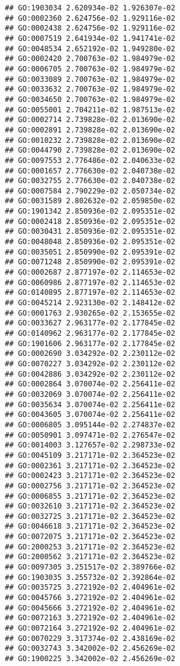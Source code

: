 \documentclass[
]{article}
\begin{document}
\begin{verbatim}
## GO:1903034 2.620934e-02 1.926307e-02
## GO:0002360 2.624756e-02 1.929116e-02
## GO:0002438 2.624756e-02 1.929116e-02
## GO:0007519 2.641934e-02 1.941741e-02
## GO:0048534 2.652192e-02 1.949280e-02
## GO:0002420 2.700763e-02 1.984979e-02
## GO:0006705 2.700763e-02 1.984979e-02
## GO:0033089 2.700763e-02 1.984979e-02
## GO:0033632 2.700763e-02 1.984979e-02
## GO:0034650 2.700763e-02 1.984979e-02
## GO:0055001 2.704211e-02 1.987513e-02
## GO:0002714 2.739828e-02 2.013690e-02
## GO:0002891 2.739828e-02 2.013690e-02
## GO:0010232 2.739828e-02 2.013690e-02
## GO:0044790 2.739828e-02 2.013690e-02
## GO:0097553 2.776486e-02 2.040633e-02
## GO:0001657 2.776630e-02 2.040738e-02
## GO:0032755 2.776630e-02 2.040738e-02
## GO:0007584 2.790229e-02 2.050734e-02
## GO:0031589 2.802632e-02 2.059850e-02
## GO:1901342 2.850936e-02 2.095351e-02
## GO:0002418 2.850936e-02 2.095351e-02
## GO:0030431 2.850936e-02 2.095351e-02
## GO:0048048 2.850936e-02 2.095351e-02
## GO:0035051 2.850990e-02 2.095391e-02
## GO:0071248 2.850990e-02 2.095391e-02
## GO:0002687 2.877197e-02 2.114653e-02
## GO:0060986 2.877197e-02 2.114653e-02
## GO:0140895 2.877197e-02 2.114653e-02
## GO:0045214 2.923130e-02 2.148412e-02
## GO:0001763 2.930265e-02 2.153655e-02
## GO:0033627 2.963177e-02 2.177845e-02
## GO:0140962 2.963177e-02 2.177845e-02
## GO:1901606 2.963177e-02 2.177845e-02
## GO:0002690 3.034292e-02 2.230112e-02
## GO:0070227 3.034292e-02 2.230112e-02
## GO:0042886 3.034292e-02 2.230112e-02
## GO:0002864 3.070074e-02 2.256411e-02
## GO:0032069 3.070074e-02 2.256411e-02
## GO:0035634 3.070074e-02 2.256411e-02
## GO:0043605 3.070074e-02 2.256411e-02
## GO:0006805 3.095144e-02 2.274837e-02
## GO:0050901 3.097471e-02 2.276547e-02
## GO:0014003 3.127657e-02 2.298733e-02
## GO:0045109 3.217171e-02 2.364523e-02
## GO:0002361 3.217171e-02 2.364523e-02
## GO:0002423 3.217171e-02 2.364523e-02
## GO:0002756 3.217171e-02 2.364523e-02
## GO:0006855 3.217171e-02 2.364523e-02
## GO:0032610 3.217171e-02 2.364523e-02
## GO:0032725 3.217171e-02 2.364523e-02
## GO:0046618 3.217171e-02 2.364523e-02
## GO:0072075 3.217171e-02 2.364523e-02
## GO:2000253 3.217171e-02 2.364523e-02
## GO:2000562 3.217171e-02 2.364523e-02
## GO:0097305 3.251517e-02 2.389766e-02
## GO:1903035 3.255732e-02 2.392864e-02
## GO:0035725 3.272192e-02 2.404961e-02
## GO:0045766 3.272192e-02 2.404961e-02
## GO:0045666 3.272192e-02 2.404961e-02
## GO:0072163 3.272192e-02 2.404961e-02
## GO:0072164 3.272192e-02 2.404961e-02
## GO:0070229 3.317374e-02 2.438169e-02
## GO:0032743 3.342002e-02 2.456269e-02
## GO:1900225 3.342002e-02 2.456269e-02

\end{verbatim}
\end{document}
